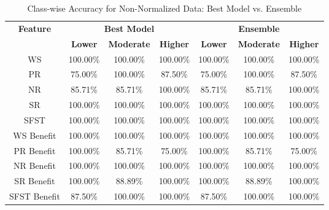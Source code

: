 \begin{table}[H]
\centering
\begin{tabular}{|c|c|c|c|c|c|c|}
\hline
\multirow{2}{*}{\textbf{Feature}} & \multicolumn{3}{c|}{\textbf{Best Model}} & \multicolumn{3}{c|}{\textbf{Ensemble}} \\
\cline{2-7}
 & \textbf{Lower} & \textbf{Moderate} & \textbf{Higher} & \textbf{Lower} & \textbf{Moderate} & \textbf{Higher} \\
\hline
WS & 100.00\% & 100.00\% & 100.00\% & 100.00\% & 100.00\% & 100.00\% \\
\hline
PR & 75.00\% & 100.00\% & 87.50\% & 75.00\% & 100.00\% & 87.50\% \\
\hline
NR & 85.71\% & 85.71\% & 100.00\% & 85.71\% & 85.71\% & 100.00\% \\
\hline
SR & 100.00\% & 100.00\% & 100.00\% & 100.00\% & 100.00\% & 100.00\% \\
\hline
SFST & 100.00\% & 100.00\% & 100.00\% & 100.00\% & 100.00\% & 100.00\% \\
\hline
WS Benefit & 100.00\% & 100.00\% & 100.00\% & 100.00\% & 100.00\% & 100.00\% \\
\hline
PR Benefit & 100.00\% & 85.71\% & 75.00\% & 100.00\% & 85.71\% & 75.00\% \\
\hline
NR Benefit & 100.00\% & 100.00\% & 100.00\% & 100.00\% & 100.00\% & 100.00\% \\
\hline
SR Benefit & 100.00\% & 88.89\% & 100.00\% & 100.00\% & 88.89\% & 100.00\% \\
\hline
SFST Benefit & 87.50\% & 100.00\% & 100.00\% & 87.50\% & 100.00\% & 100.00\% \\
\hline
\end{tabular}
\caption{Class-wise Accuracy for Non-Normalized Data: Best Model vs. Ensemble}
\label{reg_all_tab:grouping_non_norm_accuracy}
\end{table}

